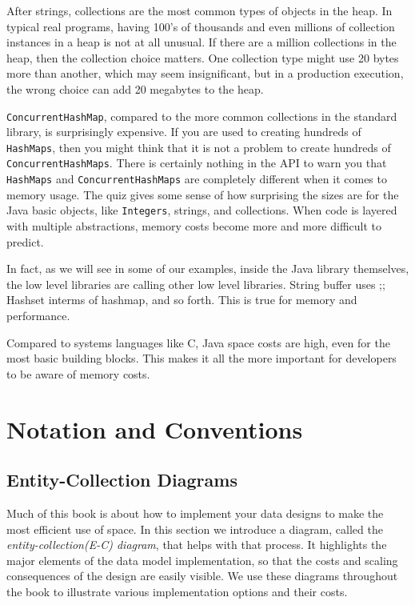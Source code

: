 After strings, collections are the most common types of objects in the heap. In typical real programs, having 100's of 
thousands and even millions of collection instances in a heap is not at all unusual. If there are a million collections 
in the heap, then the collection choice matters. One collection type might use 20 bytes more than another, 
which may seem insignificant, but in a production execution, the wrong choice can add 20 megabytes to the heap.

\texttt{ConcurrentHashMap}, compared to the more common collections in the standard library, is surprisingly expensive. 
If you are used to creating hundreds of \texttt{HashMaps}, then you might think that it is not a problem to create hundreds 
of \texttt{ConcurrentHashMaps}. There is certainly nothing in the API to warn you that \texttt{HashMaps} and 
\texttt{ConcurrentHashMaps} are completely different when it comes to memory usage. 
The quiz gives some sense of how surprising the sizes are for the Java basic objects, like \texttt{Integers}, 
strings, and collections. When code is layered with multiple abstractions, memory costs become more and more difficult 
to predict.



In fact, as we will see in some of our examples, inside the Java library themselves, the low level libraries are calling
 other low level libraries.  String buffer uses ;;  Hashset interms of hashmap, and so forth.  
 This is true for memory and performance.

Compared to systems languages like C, Java space costs are high, even for the most basic building blocks. 
This makes it all the more important for developers to be aware of memory costs.


\section{Notation and Conventions}

\subsection{Entity-Collection Diagrams}

Much of this book is about how to implement your data designs to make the most efficient use of space. In this section we introduce a diagram, called the \emph{entity-collection(E-C) diagram}, that helps with that process. It highlights the major elements of the data model implementation, so that the costs and scaling consequences of the design are easily visible. We use these diagrams throughout the book to illustrate various implementation options and their costs.

